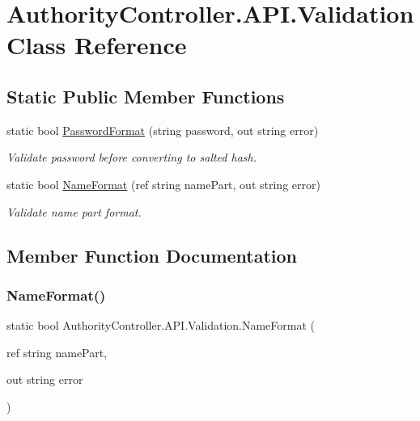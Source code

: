 \hypertarget{class_authority_controller_1_1_a_p_i_1_1_validation}{}\section{Authority\+Controller.\+A\+P\+I.\+Validation Class Reference}
\label{class_authority_controller_1_1_a_p_i_1_1_validation}
\subsection*{Static Public Member Functions}
\begin{DoxyCompactItemize}
\item 
static bool \mbox{\hyperlink{class_authority_controller_1_1_a_p_i_1_1_validation_a9aceff242f489e5d63808e28b1506487}{Password\+Format}} (string password, out string error)
\begin{DoxyCompactList}\small\item\em Validate password before converting to salted hash. \end{DoxyCompactList}\item 
static bool \mbox{\hyperlink{class_authority_controller_1_1_a_p_i_1_1_validation_a105196c0f8ec27b96594e2ac855b7db3}{Name\+Format}} (ref string name\+Part, out string error)
\begin{DoxyCompactList}\small\item\em Validate name part format. \end{DoxyCompactList}\end{DoxyCompactItemize}


\subsection{Member Function Documentation}
\mbox{\label{class_authority_controller_1_1_a_p_i_1_1_validation_a105196c0f8ec27b96594e2ac855b7db3}} 
\subsubsection{\texorpdfstring{Name\+Format()}{NameFormat()}}
{\footnotesize\ttfamily static bool Authority\+Controller.\+A\+P\+I.\+Validation.\+Name\+Format (\begin{DoxyParamCaption}\item[{ref string}]{name\+Part,  }\item[{out string}]{error }\end{DoxyParamCaption})\hspace{0.3cm}{\ttfamily [static]}}



